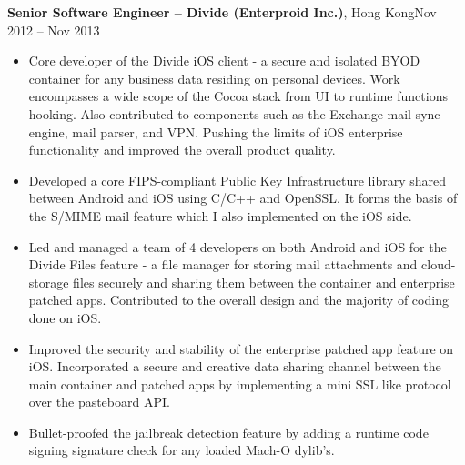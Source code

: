 \documentclass[margin,line]{res}
\begin{document}
\begin{resume}
  {\bf Senior Software Engineer -- Divide (Enterproid Inc.)}, Hong Kong\hfill Nov 2012 -- Nov 2013
  \vspace{.05in}
  \begin{itemize}
  \item Core developer of the Divide iOS client - a secure and isolated BYOD
        container for any business data residing on personal devices. Work
        encompasses a wide scope of the Cocoa stack from UI to runtime
        functions hooking. Also contributed to components such as the Exchange
        mail sync engine, mail parser, and VPN. Pushing the limits of iOS
        enterprise functionality and improved the overall product quality.
  \item Developed a core FIPS-compliant Public Key Infrastructure library shared
        between Android and iOS using C/C++ and OpenSSL. It forms the basis of
        the S/MIME mail feature which I also implemented on the iOS side.
  \item Led and managed a team of 4 developers on both Android and iOS for the
        Divide Files feature - a file manager for storing mail attachments and
        cloud-storage files securely and sharing them between the container
        and enterprise patched apps. Contributed to the overall design and
        the majority of coding done on iOS.
  \item Improved the security and stability of the enterprise patched app
        feature on iOS.
        Incorporated a secure and creative data sharing channel between the
        main container and patched apps by implementing a mini SSL like protocol
        over the pasteboard API.
  \item Bullet-proofed the jailbreak detection feature by adding a runtime code
        signing signature check for any loaded Mach-O dylib's.
  \end{itemize}


\end{resume}
\end{document}

